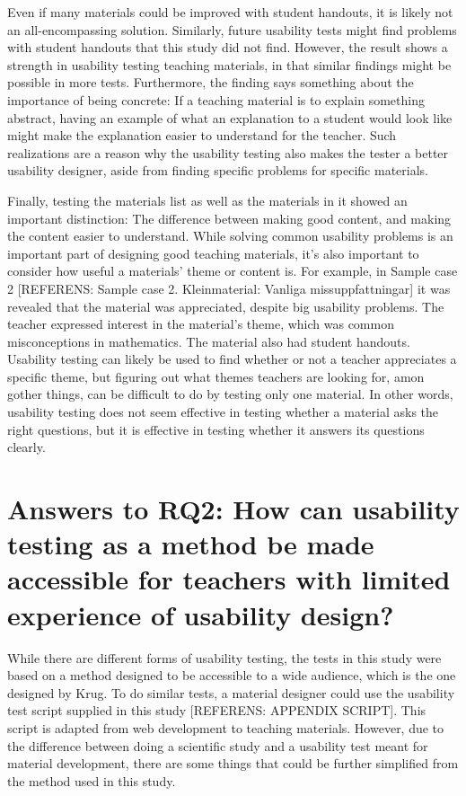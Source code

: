 Even if many materials could be improved with student handouts, it is likely not an all-encompassing solution. Similarly, future usability tests might find problems with student handouts that this study did not find. However, the result shows a strength in usability testing teaching materials, in that similar findings might be possible in more tests. Furthermore, the finding says something about the importance of being concrete: If a teaching material is to explain something abstract, having an example of what an explanation to a student would look like might make the explanation easier to understand for the teacher. Such realizations are a reason why the usability testing also makes the tester a better usability designer, aside from finding specific problems for specific materials.

Finally, testing the materials list as well as the materials in it showed an important distinction: The difference between making good content, and making the content easier to understand. While solving common usability problems is an important part of designing good teaching materials, it's also important to consider how useful a materials' theme or content is. For example, in Sample case 2 [REFERENS: Sample case 2. Kleinmaterial: Vanliga missuppfattningar] it was revealed that the material was appreciated, despite big usability problems. The teacher expressed interest in the material's theme, which was common misconceptions in mathematics. The material also had student handouts. Usability testing can likely be used to find whether or not a teacher appreciates a specific theme, but figuring out what themes teachers are looking for, amon gother things, can be difficult to do by testing only one material. In other words, usability testing does not seem effective in testing whether a material asks the right questions, but it is effective in testing whether it answers its questions clearly.

\section{Answers to RQ2: How can usability testing as a method be made accessible for teachers with limited experience of usability design?}

While there are different forms of usability testing, the tests in this study were based on a method designed to be accessible to a wide audience, which is the one designed by Krug. To do similar tests, a material designer could use the usability test script supplied in this study [REFERENS: APPENDIX SCRIPT]. This script is adapted from web development to teaching materials. However, due to the difference between doing a scientific study and a usability test meant for material development, there are some things that could be further simplified from the method used in this study.

